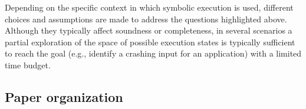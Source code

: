Depending on the specific context in which symbolic execution is used, different choices and assumptions are made to address the questions highlighted above. Although they typically affect soundness or completeness, in several scenarios a partial exploration of the space of possible execution states is typically sufficient to reach the goal (e.g., identify a crashing input for an application) with a limited time budget.


\subsection{Paper organization}

